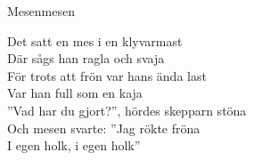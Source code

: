 \begin{song}{Mesen}{mesen}
\begin{vers}
Det satt en mes i en klyvarmast\\
Där sågs han ragla och svaja\\
För trots att frön var hans ända last\\
Var han full som en kaja\\
''Vad har du gjort?'', hördes skepparn stöna\\
Och mesen svarte: ''Jag rökte fröna\\
I egen holk, i egen holk''\\
\end{vers}
\end{song}

